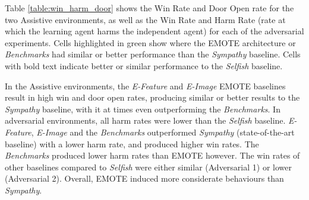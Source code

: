 Table \ref{table:win_harm_door} shows the Win Rate and Door Open rate for the two Assistive environments, as well as the Win Rate and Harm Rate (rate at which the learning agent harms the independent agent) for each of the adversarial experiments. Cells highlighted in green show where the EMOTE architecture or \emph{Benchmarks} had similar or better performance than the \emph{Sympathy} baseline. Cells with bold text indicate better or similar performance to the \emph{Selfish} baseline. 

In the Assistive environments, the \emph{E-Feature} and \emph{E-Image} EMOTE baselines result in high win and door open rates, producing similar or better results to the \emph{Sympathy} baseline, with it at times even outperforming the \emph{Benchmarks}. In adversarial environments, all harm rates were lower than the \emph{Selfish} baseline. \emph{E-Feature}, \emph{E-Image} and the \emph{Benchmarks} outperformed \emph{Sympathy} (state-of-the-art baseline) with a lower harm rate, and produced higher win rates. The \emph{Benchmarks} produced lower harm rates than EMOTE however. The win rates of other baselines compared to \emph{Selfish} were either similar (Adversarial 1) or lower (Adversarial 2).  Overall, EMOTE induced more considerate behaviours than \emph{Sympathy}.

